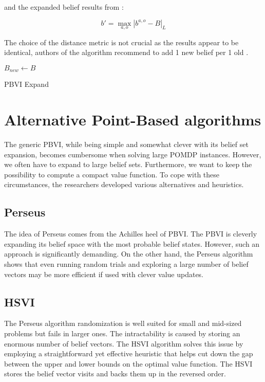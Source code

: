 and the expanded belief results from :

\begin{equation}b' = \operatorname*{max}_{a, o} |b^{a, o} - B|_L\end{equation}

The choice of the distance metric is not crucial as the results appear to be identical, authors of the algorithm recommend to add 1 new belief per 1 old \cite{pbvi}.


\LinesNumbered
\begin{algorithm}[H]
\SetAlgoLined
$B_{new} \xleftarrow{} B$ 
\caption{PBVI Expand}
\end{algorithm}



\section{Alternative Point-Based algorithms} \label{PBVI}

The generic PBVI, while being simple and somewhat clever with its belief set expansion, becomes cumbersome when solving large POMDP instances. However, we often have to expand to large belief sets. Furthermore, we want to keep the possibility to compute a compact value function. To cope with these circumstances, the researchers developed various alternatives and heuristics.


\subsection{Perseus}

The idea of Perseus \cite{perseus} comes from the Achilles heel of PBVI. The PBVI is cleverly expanding its belief space with the most probable belief states. However, such an approach is significantly demanding. On the other hand, the Perseus algorithm shows that even running random trials and exploring a large number of belief vectors may be more efficient if used with clever value updates.


\subsection{HSVI}
The Perseus algorithm randomization is well suited for small and mid-sized problems but fails in larger ones. The intractability is caused by storing an enormous number of belief vectors. The HSVI \cite{hsvi} algorithm solves this issue by employing a straightforward yet effective heuristic that helps cut down the gap between the upper and lower bounds on the optimal value function. The HSVI stores the belief vector visits and backs them up in the reversed order.


